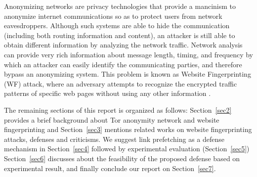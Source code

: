 Anonymizing networks are privacy technologies that provide a mancinism to anonymize internet communications so as to protect users from network eavesdroppers.
Although such systems are able to hide the communication (including both routing information and content), an attacker is still able to obtain different information by analyzing the network traffic.
Network analysis can provide very rich information about message length, timing, and frequency by which an attacker can easily identify the communicating parties, and therefore bypass an anonymizing system.
This problem is known as Website Fingerprinting (WF) attack, where an adversary attempts to recognize the encrypted traffic patterns of specific web pages without using any other information \cite{juarez14, murdoch2005low}.



The remaining sections of this report is organized as follows: Section~\ref{sec2} provides a brief background about Tor anonymity network and website fingerprinting and Section~\ref{sec3} mentions related works on website fingerprinting attacks, defenses and criticisms.
We suggest link prefetching as a defense mechanism in Section~\ref{sec4} followed by experimental evaluation (Section~\ref{sec5})
Section~\ref{sec6} discusses about the feasibility of the proposed defense based on experimental result, and finally conclude our report on Section~\ref{sec7}.

